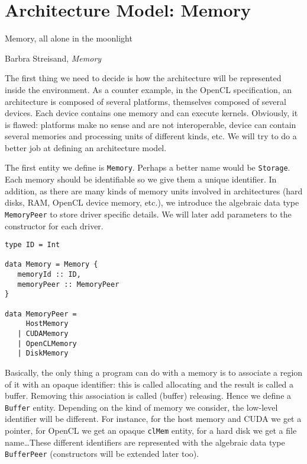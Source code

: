 \chapter{Architecture Model: Memory}

\epigraph{Memory, all alone in the moonlight}{Barbra Streisand,
\textit{Memory}}

The first thing we need to decide is how the architecture will be represented
inside the environment.  As a counter example, in the OpenCL specification, an
architecture is composed of several platforms, themselves composed of several
devices. Each device contains one memory and can execute kernels. Obviously, it
is flawed: platforms make no sense and are not interoperable, device can contain
several memories and processing units of different kinds, etc. We will try to do
a better job at defining an architecture model.

The first entity we define is \texttt{Memory}. Perhaps a better name would be
\texttt{Storage}. Each memory should be identifiable so we give them a unique
identifier. In addition, as there are many kinds of memory units involved in
architectures (hard disks, RAM, OpenCL device memory, etc.), we introduce the
algebraic data type \texttt{MemoryPeer} to store driver specific details. We
will later add parameters to the constructor for each driver.

\begin{lstlisting}
type ID = Int

data Memory = Memory {
   memoryId :: ID,
   memoryPeer :: MemoryPeer
}

data MemoryPeer =
     HostMemory
   | CUDAMemory
   | OpenCLMemory
   | DiskMemory
\end{lstlisting}

Basically, the only thing a program can do with a memory is to associate a
region of it with an opaque identifier: this is called allocating and the result
is called a buffer. Removing this association is called (buffer) releasing.
Hence we define a \texttt{Buffer} entity. Depending on the kind of memory we
consider, the low-level identifier will be different. For instance, for the host
memory and CUDA we get a pointer, for OpenCL we get an opaque \texttt{clMem}
entity, for a hard disk we get a file name\ldots These different identifiers are
represented with the algebraic data type \texttt{BufferPeer} (constructors will
be extended later too).

